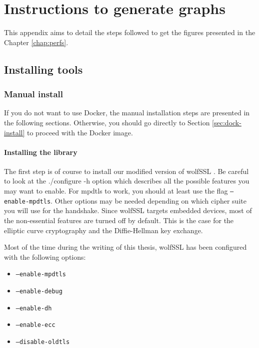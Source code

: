 \chapter{Instructions to generate graphs}
\label{app:graph}

This appendix aims to detail the steps followed to get the figures presented in the Chapter \ref{chap:perfs}.

\section{Installing tools}

\subsection{Manual install}

If you do not want to use Docker, the manual installation steps are presented in the following sections. Otherwise, you should go directly to Section \ref{sec:dock-install} to proceed with the Docker image.

\subsubsection{Installing the library}

The first step is of course to install our modified version of wolfSSL \cite{wolfssl-mpdtls}. Be careful to look at the ./configure -h option which describes all the possible features you may want to enable. For mpdtls to work, you should at least use the flag \texttt{--enable-mpdtls}. Other options may be needed depending on which cipher suite you will use for the handshake. Since wolfSSL targets embedded devices, most of the non-essential features are turned off by default. This is the case for the elliptic curve cryptography and the Diffie-Hellman key exchange.

Most of the time during the writing of this thesis, wolfSSL has been configured with the following options:

\begin{itemize}
\item \texttt{--enable-mpdtls}
\item \texttt{--enable-debug}
\item \texttt{--enable-dh}
\item \texttt{--enable-ecc}
\item \texttt{--disable-oldtls}
\end{itemize}


